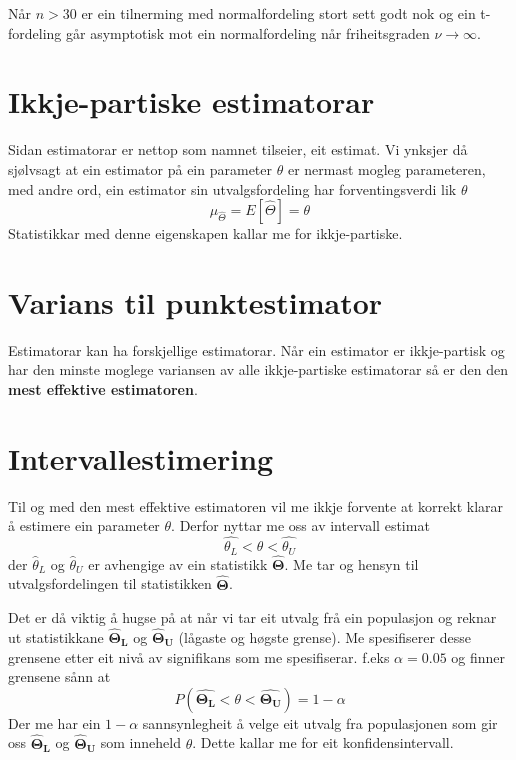 Når $n > 30$ er ein tilnerming med normalfordeling stort sett godt nok og ein t-fordeling går asymptotisk mot ein normalfordeling når friheitsgraden $\nu \rightarrow \infty$.

\section{Ikkje-partiske estimatorar}
Sidan estimatorar er nettop som namnet tilseier, eit estimat. Vi ynksjer då sjølvsagt at ein estimator på ein parameter $\theta$ er nermast mogleg parameteren, med andre ord, ein estimator sin utvalgsfordeling har forventingsverdi lik $\theta$
\begin{equation}
    \mu_{\hat{\Theta}} = E[\hat{\Theta}] = \theta
\end{equation}
Statistikkar med denne eigenskapen kallar me for ikkje-partiske.

\section{Varians til punktestimator}
Estimatorar kan ha forskjellige estimatorar. Når ein estimator er ikkje-partisk og har den minste moglege variansen av alle ikkje-partiske estimatorar så er den den \textbf{mest effektive estimatoren}.

\section{Intervallestimering}
Til og med den mest effektive estimatoren vil me ikkje forvente at korrekt klarar å estimere ein parameter $\theta$. Derfor nyttar me oss av intervall estimat
\begin{equation}
    \hat{\theta_L} < \theta < \hat{\theta_U}
\end{equation}
der $\hat{\theta}_L$ og $\hat{\theta}_U$ er avhengige av ein statistikk $\boldsymbol{\hat{\Theta}}$. Me tar og hensyn til utvalgsfordelingen til statistikken $\boldsymbol{\hat{\Theta}}$.

Det er då viktig å hugse på at når vi tar eit utvalg frå ein populasjon og reknar ut statistikkane $\boldsymbol{\hat{\Theta}_L}$ og $\boldsymbol{\hat{\Theta}_U}$ (lågaste og høgste grense). Me spesifiserer desse grensene etter eit nivå av signifikans som me spesifiserar. f.eks $\alpha = 0.05$ og finner grensene sånn at
\begin{equation}
    P(\boldsymbol{\hat{\Theta_L}} < \theta < \boldsymbol{\hat{\Theta_U}}) = 1 - \alpha
\end{equation}
Der me har ein $1-\alpha$ sannsynlegheit å velge eit utvalg fra populasjonen som gir oss $\boldsymbol{\hat{\Theta}_L}$ og $\boldsymbol{\hat{\Theta}_U}$ som inneheld $\theta$. Dette kallar me for eit konfidensintervall.

